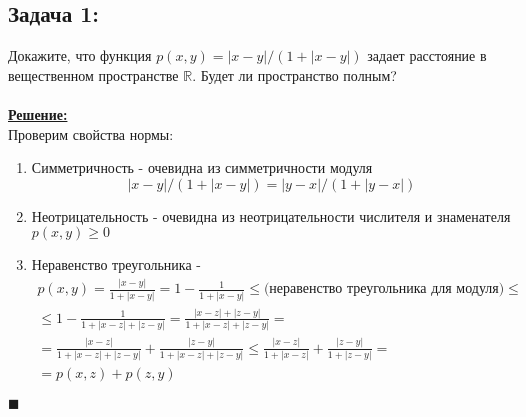 \documentclass[a4paper,12pt,titlepage,final]{article}
\begin{document}
\subsection*{Задача 1:}
\noindent Докажите, что функция $p(x, y) = |x - y|/(1 + |x - y|)$ задает расстояние в вещественном пространстве $\mathbb{R}$. Будет ли пространство полным? \\ \\
\textbf{\underline{Решение:}} \\
Проверим свойства нормы:
\begin{enumerate}
    \item Симметричность - очевидна из симметричности модуля
    $$|x - y|/(1 + |x - y|) = |y - x|/(1 + |y - x|)$$
    \item Неотрицательность - очевидна из неотрицательности числителя и знаменателя $p(x, y) \ge 0$
    \item Неравенство треугольника -
    \begin{gather*}
        p(x, y) = \frac{|x - y|}{1 + |x - y|} = 1 - \frac{1}{1 + |x - y|} \le \text{(неравенство треугольника для модуля)} \le \\
        \le 1 - \frac{1}{1 + |x - z| + |z - y|} = \frac{|x - z| + |z - y|}{1 + |x - z| + |z - y|} = \\
        = \frac{|x - z|}{1 + |x - z| + |z - y|} + \frac{|z - y|}{1 + |x - z| + |z - y|} \le \frac{|x - z|}{1 + |x - z|} + \frac{|z - y|}{1 + |z - y|} = \\
        = p(x, z) + p(z, y)
    \end{gather*}
\end{enumerate}
$\blacksquare$ \\ \\ \\
\end{document}
